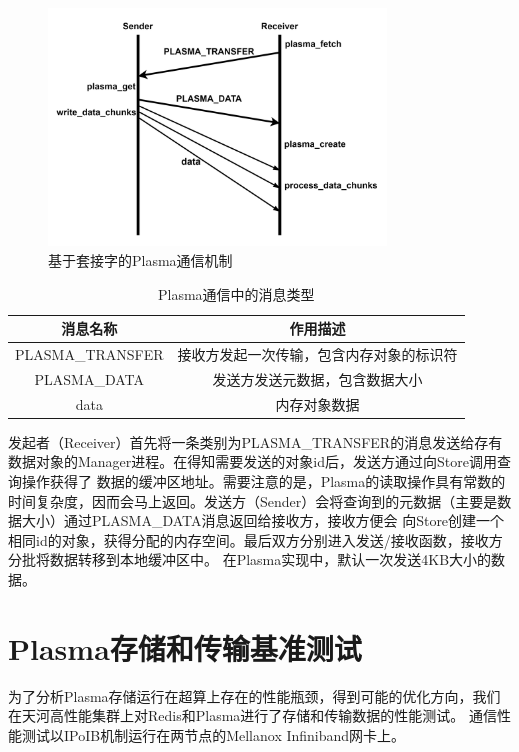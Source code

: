 \begin{figure}[h] 
    \centering
    \includegraphics[width=0.8\textwidth]{image/chap02/sock_protocol.png}
    \caption{基于套接字的Plasma通信机制}
    \label{fig:sock_protocol}
\end{figure}

\begin{table}[h]
    \centering
    \caption{Plasma通信中的消息类型}
    \begin{tabular}{*{2}{c}}
        \toprule
        消息名称 & 作用描述      \\
        \midrule
        PLASMA\_TRANSFER & 接收方发起一次传输，包含内存对象的标识符 \\
        PLASMA\_DATA & 发送方发送元数据，包含数据大小 \\
        data & 内存对象数据 \\
        \bottomrule
    \end{tabular}
    \label{tab:message_meaning}
\end{table}

发起者（Receiver）首先将一条类别为PLASMA\_TRANSFER的消息发送给存有数据对象的Manager进程。在得知需要发送的对象id后，发送方通过向Store调用查询操作获得了
数据的缓冲区地址。需要注意的是，Plasma的读取操作具有常数的时间复杂度，因而会马上返回。发送方（Sender）会将查询到的元数据（主要是数据大小）通过PLASMA\_DATA消息返回给接收方，接收方便会
向Store创建一个相同id的对象，获得分配的内存空间。最后双方分别进入发送/接收函数，接收方分批将数据转移到本地缓冲区中。
在Plasma实现中，默认一次发送4KB大小的数据。

\section{Plasma存储和传输基准测试}
\label{sec:bench}

为了分析Plasma存储运行在超算上存在的性能瓶颈，得到可能的优化方向，我们在天河高性能集群上对Redis和Plasma进行了存储和传输数据的性能测试。
通信性能测试以IPoIB机制运行在两节点的Mellanox Infiniband网卡上。


